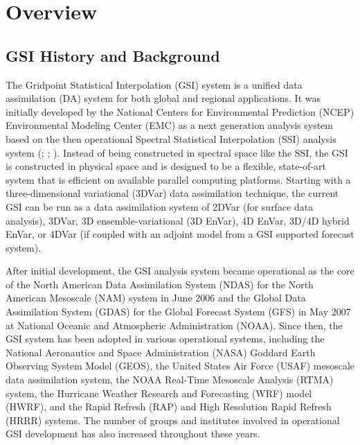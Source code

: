 \chapter{Overview}\label{overview}

\section{GSI History and Background}

The Gridpoint Statistical Interpolation (GSI) system is a unified data assimilation (DA) system for both global and regional applications. It was initially developed by the National Centers for Environmental Prediction (NCEP) Environmental Modeling Center (EMC) as a next generation analysis system based on the then operational Spectral Statistical Interpolation (SSI) analysis system (\cite{Wu2002}; \cite{Purser2003a}; \cite{Purser2003b}). Instead of being constructed in spectral space like the SSI, the GSI is constructed in physical space and is designed to be a flexible, state-of-art system that is efficient on available parallel computing platforms. Starting with a three-dimensional variational (3DVar) data assimilation technique, the current GSI can be run as a data assimilation system of 2DVar (for surface data analysis), 3DVar, 3D ensemble-variational (3D EnVar), 4D EnVar, 3D/4D hybrid EnVar, or 4DVar (if coupled with an adjoint model from a GSI supported forecast system).

After initial development, the GSI analysis system became operational as the core of the North American Data Assimilation System (NDAS) for the North American Mesoscale (NAM) system in June 2006 and the Global Data Assimilation System (GDAS) for the Global Forecast System (GFS) in May 2007 at National Oceanic and Atmospheric Administration (NOAA). Since then, the GSI system has been adopted in various operational systems, including the National Aeronautics and Space Administration (NASA) Goddard Earth Observing System Model (GEOS), the United States Air Force (USAF) mesoscale data assimilation system, the NOAA Real-Time Mesoscale Analysis (RTMA) system, the Hurricane Weather Research and Forecasting (WRF) model (HWRF), and the Rapid Refresh (RAP) and High Resolution Rapid Refresh (HRRR) systems. The number of groups and institutes involved in operational GSI development has also increased throughout these years.

